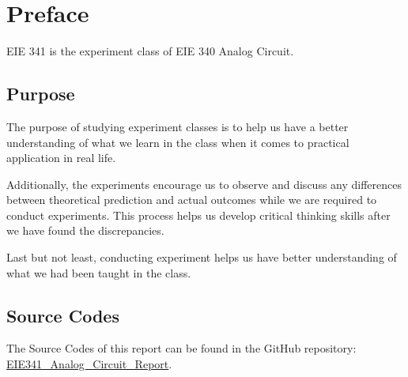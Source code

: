 \chapter*{Preface}
\Large EIE 341 is the experiment class of EIE 340 Analog Circuit.\par

\section{Purpose}

The purpose of studying experiment classes is to help us have a
better understanding of what we learn in the class when it comes to practical application in real life.\par

Additionally, the experiments encourage us to observe and discuss any differences between theoretical prediction and actual outcomes while we are required to conduct experiments. This process helps us develop critical thinking skills after we have found the discrepancies.\par

Last but not least, conducting experiment helps us have better understanding of what we had been taught in the class.

\section{Source Codes}
The Source Codes of this report can be found in the GitHub repository: 
    \href{https://github.com/SalmonSeanZ/EIE341_Analog_Circuit_Report}
        {EIE341\_Analog\_Circuit\_Report}.
\FloatBarrier